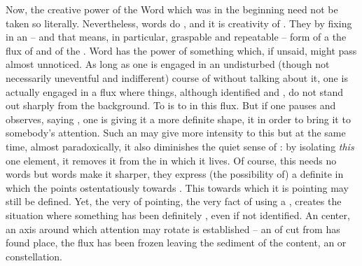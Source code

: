 Now, the creative power of the Word which was in the beginning need not be taken
so literally.  Nevertheless, words do , and it is
creativity of .  They  by fixing in an  --
and that means, in particular, graspable and repeatable -- form of a 
the flux of  and of the .  Word has the power of
 something which, if unsaid, might pass almost unnoticed.  As long
as one is engaged in an undisturbed (though not necessarily uneventful and
indifferent) course of  without talking about it, one is actually
engaged in a flux where things, although identified and , do not
stand out sharply from the background.  To  is to
 in this flux.  But if one pauses and observes, saying , one is giving it a more definite shape,
 it in order to bring it to somebody's attention. Such an
 may give more intensity to this  but at the same
time, almost paradoxically, it also diminishes the quiet sense of
: by isolating {\em this} one element, it removes it from the
 in which it lives. Of course, this  needs no words
but words make it sharper, they express (the possibility of) a definite
 in which the  points ostentatiously towards
\thi{\ldots}.  This \thi{\ldots} towards which it is pointing may still be
 defined.  Yet, the very  of pointing, the very fact of
using a , creates the situation where something has been definitely
, even if not  identified.  An 
center, an axis around which attention may rotate is established -- an 
of  {cut} from  has found place, the flux has been
frozen leaving the sediment of the  content, an  or
 constellation.

